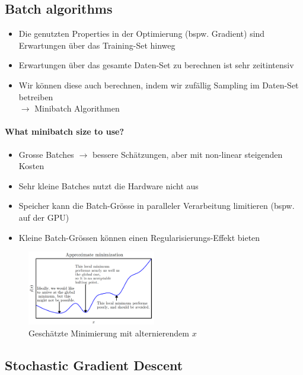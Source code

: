 \documentclass[a4paper]{article}
\begin{document}
		\subsection{Batch algorithms}
		
		\begin{itemize}
			\item Die genutzten Properties in der Optimierung (bspw. Gradient) sind Erwartungen über das Training-Set hinweg
			\item Erwartungen über das gesamte Daten-Set zu berechnen ist sehr zeitintensiv
			\item Wir können diese auch berechnen, indem wir zufällig Sampling im Daten-Set betreiben \\ 
				$\rightarrow$ Minibatch Algorithmen
		\end{itemize}
	
		\newpage
	
		\paragraph{What minibatch size to use?}
		
		\begin{itemize}
			\item Grosse Batches $\rightarrow$ bessere Schätzungen, aber mit non-linear steigenden Kosten
			\item Sehr kleine Batches nutzt die Hardware nicht aus
			\item Speicher kann die Batch-Grösse in paralleler Verarbeitung limitieren (bspw. auf der GPU)
			\item Kleine Batch-Grössen können einen Regularisierungs-Effekt bieten
		\end{itemize}
	
		\begin{figure}[htb!]
			\centering
			\includegraphics[width=0.5\textwidth]{img/06_deep_nn/approx_mini.png}
			\caption{Geschätzte Minimierung mit alternierendem $x$}
			\label{fig:06_deep_nn_approx_minimization}
		\end{figure}
	
		\subsection{Stochastic Gradient Descent}
		
\end{document}
